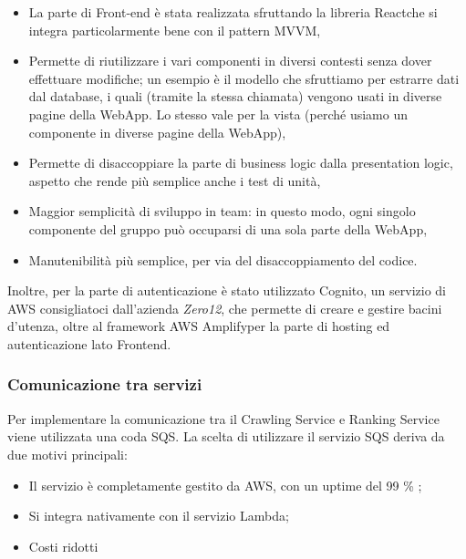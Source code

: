\begin{itemize}
\item La parte di Front-end è stata realizzata sfruttando la libreria React\glo che si integra particolarmente bene con il pattern MVVM,
\item Permette di riutilizzare i vari componenti in diversi contesti senza dover effettuare modifiche; un esempio è il modello che sfruttiamo per estrarre dati dal database, i quali (tramite la stessa chiamata) vengono usati in diverse pagine della WebApp. Lo stesso vale per la vista (perché usiamo un componente in diverse pagine della WebApp),
\item Permette di disaccoppiare la parte di business logic dalla presentation logic, aspetto che rende più semplice anche i test di unità,
\item Maggior semplicità di sviluppo in team: in questo modo, ogni singolo componente del gruppo può occuparsi di una sola parte della WebApp,
\item Manutenibilità più semplice, per via del disaccoppiamento del codice.
\end{itemize}
Inoltre, per la parte di autenticazione è stato utilizzato Cognito\glo, un servizio di AWS consigliatoci dall'azienda \textit{Zero12}, che permette di creare e gestire bacini d'utenza, oltre al framework AWS Amplify\glo per la parte di hosting ed autenticazione lato Frontend.

\subsubsection{Comunicazione tra servizi}
Per implementare la comunicazione tra il Crawling Service e Ranking Service viene utilizzata una coda SQS. La scelta di utilizzare il servizio SQS deriva da due motivi principali:
\begin{itemize}
\item Il servizio è completamente gestito da AWS, con un uptime del 99 \% ;
\item Si integra nativamente con il servizio Lambda\glo ;
\item Costi ridotti
\end{itemize}

